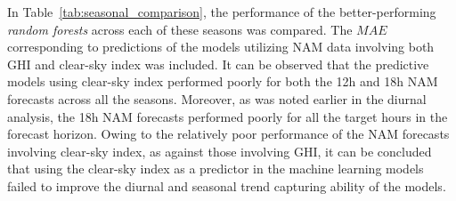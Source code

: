 \par In Table~\ref{tab:seasonal_comparison}, the performance of the better-performing \textit{random forests} across each of these seasons was compared. The $MAE$ corresponding to predictions of the models utilizing NAM data involving both GHI and clear-sky index was included. It can be observed that the predictive models using clear-sky index performed poorly for both the 12h and 18h NAM forecasts across all the seasons. Moreover, as was noted earlier in the diurnal analysis, the 18h NAM forecasts performed poorly for all the target hours in the forecast horizon. Owing to the relatively poor performance of the NAM forecasts involving clear-sky index, as against those involving GHI, it can be concluded that using the clear-sky index as a predictor in the machine learning models failed to improve the diurnal and seasonal trend capturing ability of the models.



\newpage